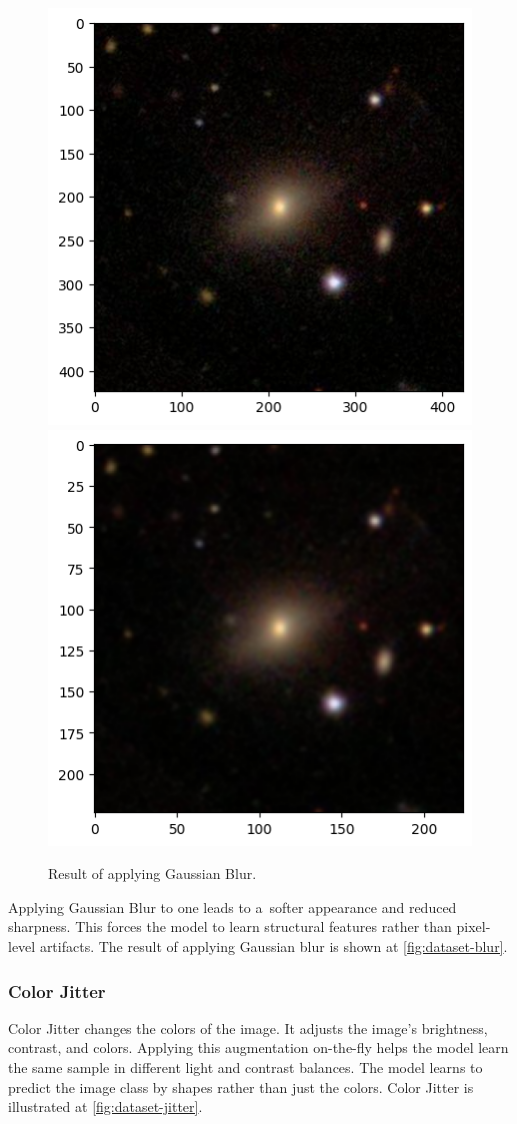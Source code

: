 \begin{figure}[htbp]\centering
  \centering
  \includegraphics[width=0.5\linewidth]{obrazky-figures/03-dataset/orig.png}\hfill
  \includegraphics[width=0.5\linewidth]{obrazky-figures/03-dataset/blur.png}
  \caption{Result of applying Gaussian Blur.}
  \label{fig:dataset-blur}
\end{figure}

Applying Gaussian Blur to one leads to a~softer appearance and reduced sharpness. This forces the model to learn structural features rather than pixel-level artifacts. The result of applying Gaussian blur is shown at \autoref{fig:dataset-blur}.

\subsubsection*{Color Jitter}

Color Jitter changes the colors of the image. It adjusts the image's brightness, contrast, and colors. Applying this augmentation on-the-fly helps the model learn the same sample in different light and contrast balances. The model learns to predict the image class by shapes rather than just the colors. Color Jitter is illustrated at \autoref{fig:dataset-jitter}.

